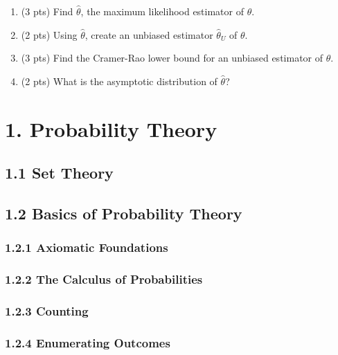 \documentclass[6pt,Portrait]{article}
\begin{document}
\begin{enumerate}
\def\labelenumi{(\alph{enumi})}
\item
  (3 pts) Find \(\hat\theta\), the maximum likelihood estimator of
  \(\theta\).
\item
  (2 pts) Using \(\hat\theta\), create an unbiased estimator
  \(\hat\theta_U\) of \(\theta\).
\item
  (3 pts) Find the Cramer-Rao lower bound for an unbiased estimator of
  \(\theta\).
\item
  (2 pts) What is the asymptotic distribution of \(\hat\theta\)?
\end{enumerate}

\hypertarget{probability-theory}{%
\section{1. Probability Theory}\label{probability-theory}}

\hypertarget{set-theory}{%
\subsection{1.1 Set Theory}\label{set-theory}}

\hypertarget{basics-of-probability-theory}{%
\subsection{1.2 Basics of Probability
Theory}\label{basics-of-probability-theory}}

\hypertarget{axiomatic-foundations}{%
\subsubsection{1.2.1 Axiomatic
Foundations}\label{axiomatic-foundations}}

\hypertarget{the-calculus-of-probabilities}{%
\subsubsection{1.2.2 The Calculus of
Probabilities}\label{the-calculus-of-probabilities}}

\hypertarget{counting}{%
\subsubsection{1.2.3 Counting}\label{counting}}

\hypertarget{enumerating-outcomes}{%
\subsubsection{1.2.4 Enumerating Outcomes}\label{enumerating-outcomes}}
\end{document}

